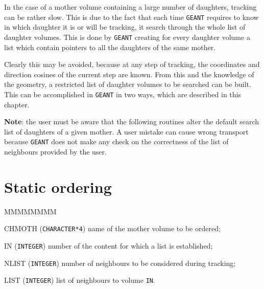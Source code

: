                
                


In the case of a mother volume containing a large number of daughters,
tracking can be rather slow. This is due to the fact that each time
{\tt GEANT} requires to know in which daughter it is or will be tracking,
it search through the whole list of daughter volumes.
This is done by {\tt GEANT} creating for every daughter volume a list
which contain pointers to all the daughters of the same mother.

Clearly this may be avoided, because at any step of tracking, the 
coordinates and direction cosines of the current step are known. From this
and the knowledge of the geometry, a restricted list of daughter volumes 
to be searched can be built. This can be accomplished in {\tt GEANT} in
two ways, which are described in this chapter.

{\bf Note}: the user must be aware that the following routines alter the
default search list of daughters of a given mother. A user mistake can
cause wrong transport because {\tt GEANT} does not make any check on the
correctness of the list of neighbours provided by the user.

\section*{Static ordering}
\begin{DLtt}{MMMMMMMM}
\item[CHMOTH] ({\tt CHARACTER*4}) name of the mother volume to be ordered;
\item[IN]     ({\tt INTEGER}) number of the content for which a list
is established;
\item[NLIST]  ({\tt INTEGER}) number of neighbours to be considered 
during tracking;
\item[LIST]  ({\tt INTEGER}) list of neighbours to volume {\tt IN}.
\end{DLtt}

